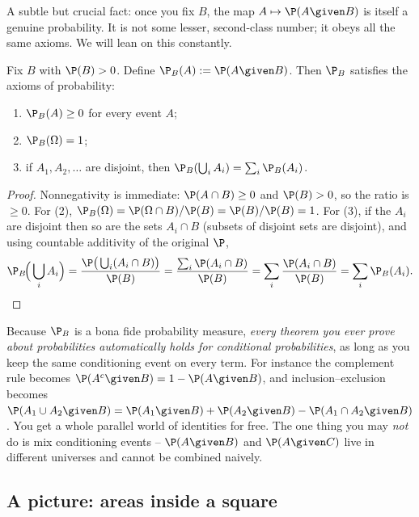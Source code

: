 A subtle but crucial fact: once you fix $B$, the map $A \mapsto \P(A \given B)$ is itself a genuine probability. It is not some lesser, second-class number; it obeys all the same axioms. We will lean on this constantly.

\begin{proposition}
\label{ch04:cond-is-measure}
Fix $B$ with $\P(B) > 0$. Define $\P_B(A) := \P(A \given B)$. Then $\P_B$ satisfies the axioms of probability:
\begin{enumerate}
\item $\P_B(A) \ge 0$ for every event $A$;
\item $\P_B(\Omega) = 1$;
\item if $A_1, A_2, \dots$ are disjoint, then $\P_B\!\left(\bigcup_i A_i\right) = \sum_i \P_B(A_i)$.
\end{enumerate}
\end{proposition}

\begin{proof}
Nonnegativity is immediate: $\P(A\cap B) \ge 0$ and $\P(B) > 0$, so the ratio is $\ge 0$. For (2), $\P_B(\Omega) = \P(\Omega \cap B)/\P(B) = \P(B)/\P(B) = 1$. For (3), if the $A_i$ are disjoint then so are the sets $A_i \cap B$ (subsets of disjoint sets are disjoint), and using countable additivity of the original $\P$,
\[
\P_B\!\Big(\bigcup_i A_i\Big)
= \frac{\P\big(\bigcup_i (A_i \cap B)\big)}{\P(B)}
= \frac{\sum_i \P(A_i \cap B)}{\P(B)}
= \sum_i \frac{\P(A_i \cap B)}{\P(B)}
= \sum_i \P_B(A_i). \qedhere
\]
\end{proof}

\begin{happeningbox}
Because $\P_B$ is a bona fide probability measure, \emph{every theorem you ever prove about probabilities automatically holds for conditional probabilities}, as long as you keep the same conditioning event on every term. For instance the complement rule becomes $\P(A^c \given B) = 1 - \P(A \given B)$, and inclusion--exclusion becomes $\P(A_1 \cup A_2 \given B) = \P(A_1\given B) + \P(A_2 \given B) - \P(A_1 \cap A_2 \given B)$. You get a whole parallel world of identities for free. The one thing you may \emph{not} do is mix conditioning events -- $\P(A\given B)$ and $\P(A \given C)$ live in different universes and cannot be combined naively.
\end{happeningbox}

\subsection{A picture: areas inside a square}

